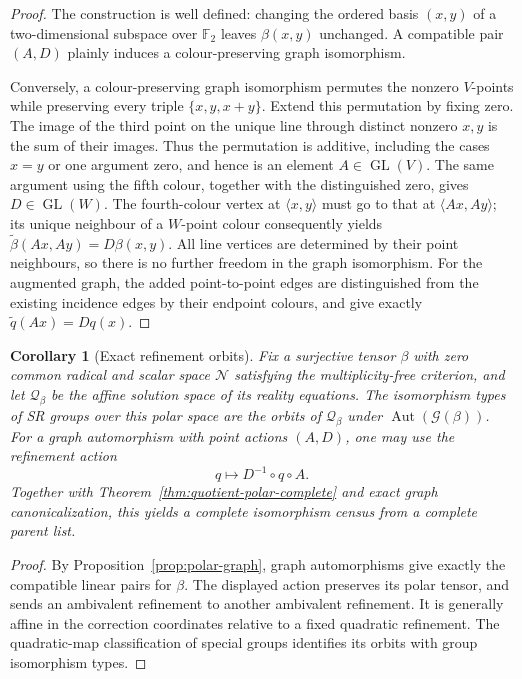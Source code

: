 \documentclass[11pt,a4paper]{amsart}
\newtheorem{corl}[thm]{Corollary}
\theoremstyle{definition}
\theoremstyle{remark}
\DeclareMathOperator{\GL}{GL}
\numberwithin{equation}{section}
\begin{document}
\begin{proof}
The construction is well defined: changing the ordered basis
$(x,y)$ of a two-dimensional subspace over $\mathbb F_2$ leaves
$\beta(x,y)$ unchanged. A compatible pair $(A,D)$ plainly induces
a colour-preserving graph isomorphism.

Conversely, a colour-preserving graph isomorphism permutes the
nonzero $V$-points while preserving every triple $\{x,y,x+y\}$.
Extend this permutation by fixing zero. The image of the third point
on the unique line through distinct nonzero $x,y$ is the sum of their
images. Thus the permutation is additive, including the cases
$x=y$ or one argument zero, and hence is an element $A\in\GL(V)$.
The same argument using the fifth colour, together with the
distinguished zero, gives $D\in\GL(W)$.
The fourth-colour vertex at $\langle x,y\rangle$ must go to that
at $\langle Ax,Ay\rangle$; its unique neighbour of a $W$-point
colour consequently yields
$\widetilde\beta(Ax,Ay)=D\beta(x,y)$.
All line vertices are determined by their point neighbours, so
there is no further freedom in the graph isomorphism.
For the augmented graph, the added point-to-point edges are
distinguished from the existing incidence edges by their endpoint
colours, and give exactly $\widetilde q(Ax)=Dq(x)$.
\end{proof}

\begin{corl}[Exact refinement orbits]\label{cor:graph-refinement-orbits}
Fix a surjective tensor $\beta$ with zero common radical and
scalar space $\mathcal N$ satisfying the multiplicity-free criterion,
and let $\mathcal Q_\beta$ be the affine solution space of its
reality equations. The isomorphism types of SR groups over this
polar space are the orbits of $\mathcal Q_\beta$ under
$\operatorname{Aut}(\mathcal G(\beta))$. For a graph automorphism
with point actions $(A,D)$, one may use the refinement action
\[
 q\longmapsto D^{-1}\circ q\circ A.
\]
Together with Theorem~\ref{thm:quotient-polar-complete} and exact
graph canonicalization, this yields a complete isomorphism census
from a complete parent list.
\end{corl}
\begin{proof}
By Proposition~\ref{prop:polar-graph}, graph automorphisms give
exactly the compatible linear pairs for $\beta$. The displayed
action preserves its polar tensor, and sends an ambivalent
refinement to another ambivalent refinement. It is generally
affine in the correction coordinates relative to a fixed
quadratic refinement. The quadratic-map classification of special
groups identifies its orbits with group isomorphism types.
\end{proof}
\end{document}

